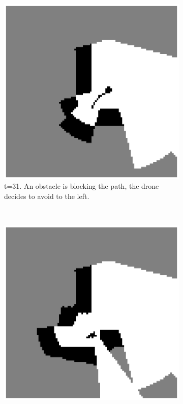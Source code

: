 \begin{figure}
\begin{subfigure}[t]{0.24\textwidth}
\includegraphics[width=\textwidth]{Figures/squeeze/t31_blocking_obstacle.eps}
\caption{t=31. An obstacle is blocking the path, the drone decides to avoid to the left.}
\label{fig:squeeze31}
\end{subfigure}
\,
\begin{subfigure}[t]{0.24\textwidth}
\includegraphics[width=\textwidth]{Figures/squeeze/t61_quarter_Speed_wring_dir.eps}

\end{subfigure}
\end{figure}
